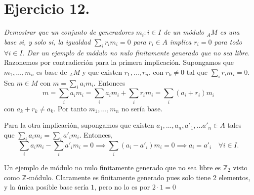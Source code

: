 \section{Ejercicio 12.}%
\label{sec:ejercicio_12_}

\textit{Demostrar que un conjunto de generadores $m_i: i \in I$ de un módulo  ${}_AM$ es una base si, y solo si, la igualdad $\sum_i r_i m_i = 0$ para $r_i \in A$ implica $r_i = 0$ para todo $\forall i \in I$. Dar un ejemplo de módulo no nulo finitamente generado que no sea libre.}\\

Razonemos por contradicción para la primera implicación. Supongamos que $m_1, \dots, m_n$ es base de ${}_AM$ y que existen $r_1, \dots, r_n$, con $r_k \neq 0$ tal que $\sum_i r_i m_i = 0$. Sea $m \in M$ con $m = \sum_i a_i m_i$. Entonces
\[
m = \sum_i a_i m_i = \sum_i a_i m_i + \sum_i r_i m_i = \sum_i(a_i+r_i)m_i
\]
con $a_k + r_k \neq a_k$. Por tanto $m_1, \dots, m_n$ no sería base.

Para la otra implicación, supongamos que existen $ a_1, \dots, a_n, a'_1, \dots a'_n \in A$ tales que $\sum_i a_im_i= \sum_i a'_im_i$. Entonces,
\[
\sum_i a_i m_i - \sum_i a'_i m_i = 0 \implies \sum_i (a_i - a'_i)m_i = 0 \implies a_i = a'_i \quad \forall i \in I
.\]

Un ejemplo de módulo no nulo finitamente generado que no sea libre es $\mathbb{Z}_2$ visto como $\mathbb{Z}$-módulo. Claramente es finitamente generado pues solo tiene 2 elementos, y la única posible base sería ${1}$, pero no lo es por $2 \cdot 1 = 0$
